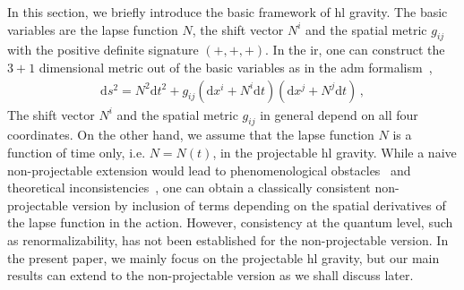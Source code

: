 \documentclass[superscriptaddress,aps,preprintnumbers,nofootinbib]{revtex4-2}
\begin{document}
In this section, we briefly introduce the basic framework of \ac{hl} gravity. The basic variables are the lapse function $N$, the shift vector $N^i$ and the spatial metric $g_{ij}$ with the positive definite signature $(+,+,+)$. In the \ac{ir}, one can construct the $3 + 1$ dimensional metric out of the basic variables as in the \ac{adm} formalism~\cite{Arnowitt:1962hi}, 
\begin{align}
\mathrm{d} s^2 = N^2 \mathrm{d} t^2 + g_{i j} (\mathrm{d} x^i + N^i \mathrm{d} t) (\mathrm{d} x^j + N^j \mathrm{d} t)\,,
\end{align}
The shift vector $N^i$ and the spatial metric $g_{ij}$ in general depend on all four coordinates. On the other hand, we assume that the lapse function $N$ is a function of time only, i.e. $N=N(t)$, in the projectable \ac{hl} gravity. While a naive non-projectable extension would lead to phenomenological obstacles~\cite{Charmousis:2009tc} and theoretical inconsistencies~\cite{Li:2009bg}, one can obtain a classically consistent non-projectable version by inclusion of terms depending on the spatial derivatives of the lapse function in the action. However, consistency at the quantum level, such as renormalizability, has not been established for the non-projectable version. In the present paper, we mainly focus on the projectable \ac{hl} gravity, but our main results can extend to the non-projectable version as we shall discuss later. 
\end{document}
